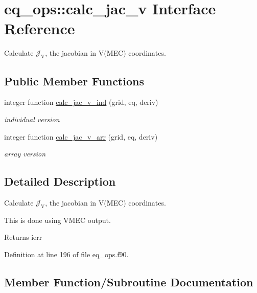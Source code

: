 \hypertarget{interfaceeq__ops_1_1calc__jac__v}{}\section{eq\+\_\+ops\+:\+:calc\+\_\+jac\+\_\+v Interface Reference}
\label{interfaceeq__ops_1_1calc__jac__v}


Calculate $\mathcal{J}_\text{V}$, the jacobian in V(\+M\+E\+C) coordinates.  


\subsection*{Public Member Functions}
\begin{DoxyCompactItemize}
\item 
integer function \hyperlink{interfaceeq__ops_1_1calc__jac__v_aee94f0bad510a7c93f9ae0d185dc4965}{calc\+\_\+jac\+\_\+v\+\_\+ind} (grid, eq, deriv)
\begin{DoxyCompactList}\small\item\em individual version \end{DoxyCompactList}\item 
integer function \hyperlink{interfaceeq__ops_1_1calc__jac__v_a93f9c07c6d225f6cbd200a100b14ccc8}{calc\+\_\+jac\+\_\+v\+\_\+arr} (grid, eq, deriv)
\begin{DoxyCompactList}\small\item\em array version \end{DoxyCompactList}\end{DoxyCompactItemize}


\subsection{Detailed Description}
Calculate $\mathcal{J}_\text{V}$, the jacobian in V(\+M\+E\+C) coordinates. 

This is done using V\+M\+EC output.

\begin{DoxyReturn}{Returns}
ierr 
\end{DoxyReturn}


Definition at line 196 of file eq\+\_\+ops.\+f90.



\subsection{Member Function/\+Subroutine Documentation}
\mbox{\label{interfaceeq__ops_1_1calc__jac__v_a93f9c07c6d225f6cbd200a100b14ccc8}} 
